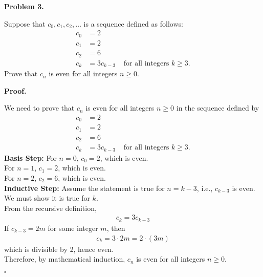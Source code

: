 \documentclass{article}
\newenvironment{problem}[1]{
    \begin{mdframed}[backgroundcolor=gray!20, skipabove=\baselineskip, skipbelow=\baselineskip, nobreak=true, innerleftmargin=10pt, innerrightmargin=10pt, innertopmargin=10pt, innerbottommargin=10pt]
    \textbf{Problem #1.}
}{
    \end{mdframed}
}
\newenvironment{proof}{
    \begin{mdframed}[nobreak=false, innerleftmargin=10pt, innerrightmargin=10pt, innertopmargin=10pt, innerbottommargin=10pt]
    \textbf{Proof.}
}{
    \hfill $\square$
    \end{mdframed}
}
\begin{document}
    \begin{problem}{3}
        Suppose that $c_0, c_1, c_2, \ldots$ is a sequence defined as follows:
        \begin{align*}
            c_0 &= 2 \\
            c_1 &= 2 \\
            c_2 &= 6 \\
            c_k &= 3c_{k-3} & \text{ for all integers } k \geq 3.
        \end{align*}
        Prove that $c_n$ is even for all integers $n \geq 0$.
    \end{problem}
    \begin{proof}
        We need to prove that $c_n$ is even for all integers $n \geq 0$ in the sequence defined by
        \begin{align*}
            c_0 &= 2 \\
            c_1 &= 2 \\
            c_2 &= 6 \\
            c_k &= 3c_{k-3} & \text{ for all integers } k \geq 3.
        \end{align*}
        \textbf{Basis Step:}
        For $n = 0$, $c_0 = 2$, which is even. \\
        For $n = 1$, $c_1 = 2$, which is even. \\
        For $n = 2$, $c_2 = 6$, which is even. \\
        \textbf{Inductive Step:}
        Assume the statement is true for $n = k-3$, i.e., $c_{k-3}$ is even. We must show it is true for $k$. \\
        From the recursive definition,
        \begin{align*}
            c_k = 3c_{k-3}
        \end{align*}
        If $c_{k-3} = 2m$ for some integer $m$, then
        \begin{align*}
            c_k = 3 \cdot 2m = 2 \cdot (3m)
        \end{align*}
        which is divisible by 2, hence even. \\
        Therefore, by mathematical induction, $c_n$ is even for all integers $n \geq 0$.
    \end{proof}
\end{document}
